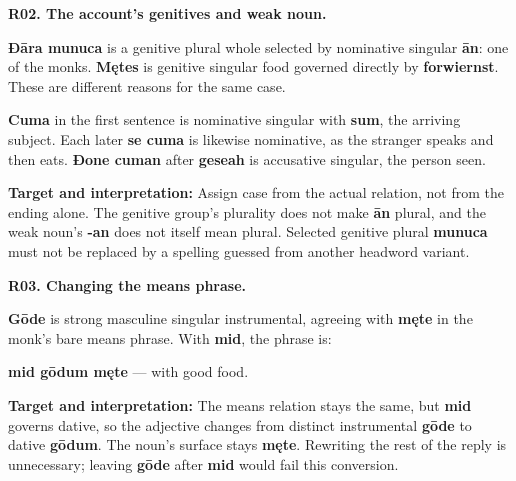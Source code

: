 \par\begin{minipage}{\linewidth}\raggedright
\textbf{R02. The account’s genitives and weak noun.}

\textbf{Ðāra munuca} is a genitive plural whole selected by nominative singular \textbf{ān}: one of the monks. \textbf{Mętes} is genitive singular food governed directly by \textbf{forwiernst}. These are different reasons for the same case.

\textbf{Cuma} in the first sentence is nominative singular with \textbf{sum}, the arriving subject. Each later \textbf{se cuma} is likewise nominative, as the stranger speaks and then eats. \textbf{Ðone cuman} after \textbf{geseah} is accusative singular, the person seen.

\textbf{Target and interpretation:} Assign case from the actual relation, not from the ending alone. The genitive group's plurality does not make \textbf{ān} plural, and the weak noun's \textbf{-an} does not itself mean plural. Selected genitive plural \textbf{munuca} must not be replaced by a spelling guessed from another headword variant.

\end{minipage}\par\addvspace{4pt}

\par\begin{minipage}{\linewidth}\raggedright
\textbf{R03. Changing the means phrase.}

\textbf{Gōde} is strong masculine singular instrumental, agreeing with \textbf{męte} in the monk's bare means phrase. With \textbf{mid}, the phrase is:

\textbf{mid gōdum męte} — with good food.

\textbf{Target and interpretation:} The means relation stays the same, but \textbf{mid} governs dative, so the adjective changes from distinct instrumental \textbf{gōde} to dative \textbf{gōdum}. The noun's surface stays \textbf{męte}. Rewriting the rest of the reply is unnecessary; leaving \textbf{gōde} after \textbf{mid} would fail this conversion.

\end{minipage}\par\addvspace{4pt}

